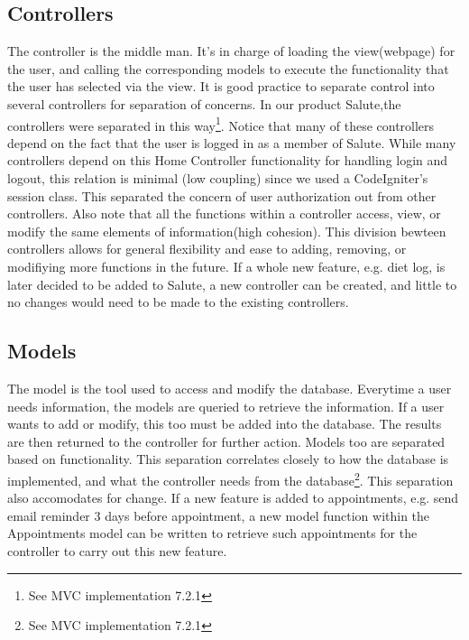 \documentclass[12pt]{report}
\begin{document}
\subsection{Controllers}

The controller is the middle man. It's in charge of loading the view(webpage) for the user, and calling the corresponding models to execute the functionality that the user has selected via the view. 
It is good practice to separate control into several controllers for separation of concerns. In our product Salute,the controllers were separated in this way\footnote{See MVC implementation 7.2.1}. Notice that many of these controllers depend on the fact that the user is logged in as a member of Salute. While many controllers depend on this Home Controller functionality for handling login and logout, this relation is minimal (low coupling) since we used a CodeIgniter's session class. This separated the concern of user authorization out from other controllers. 
Also note that all the functions within a controller access, view, or modify the same elements of information(high cohesion). This division bewteen controllers allows for general flexibility and ease to adding, removing, or modifiying more functions in the future. If a whole new feature, e.g. diet log, is later decided to be added to Salute, a new controller can be created, and little to no changes would need to be made to the existing controllers. 
\subsection{Models}
The model is the tool used to access and modify the database. Everytime a user needs information, the models are queried to retrieve the information. If a user wants to add or modify, this too must be added into the database. The results are then returned to the controller for further action.
Models too are separated based on functionality. This separation correlates closely to how the database is implemented, and what the controller needs from the database\footnote{See MVC implementation 7.2.1}. This separation also accomodates for change. If a new feature is added to appointments, e.g. send email reminder 3 days before appointment, a new model function within the Appointments model can be written to retrieve such appointments for the controller to carry out this new feature. 
\end{document}
